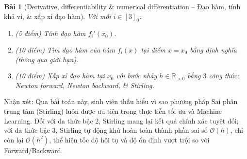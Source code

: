 \documentclass{article}
\newtheorem{baitoan}{Bài}
\begin{document}
\begin{baitoan}[Derivative, differentiability \& numerical differentiation -- Đạo hàm, tính khả vi, \& xấp xỉ đạo hàm]
	Với mỗi $i\in[3]_0$:
	\begin{enumerate}[label=(\alph*)]
		\item {\rm(5 điểm)} Tính đạo hàm $f_i'(x_0)$.
		\item {\rm(10 điểm)} Tìm đạo hàm của hàm $f_i(x)$ tại điểm $x = x_0$ bằng định nghĩa (thông qua giới hạn).
		\item {\rm(10 điểm)} Xấp xỉ đạo hàm tại $x_0$ với bước nhảy $h \in \mathbb{R}_{>0}$ bằng $3$ công thức: Newton forward, Newton backward, \& Stirling.
	\end{enumerate}
\end{baitoan}

\textsf{Nhận xét}: Qua bài toán này, sinh viên thấu hiểu vì sao phương pháp Sai phân trung tâm (Stirling) luôn được ưu tiên trong thực tiễn tối ưu và Machine Learning. Đối với đa thức bậc 2, Stirling mang lại kết quả chính xác tuyệt đối; với đa thức bậc 3, Stirling tự động khử hoàn toàn thành phần sai số $\mathcal{O}(h)$, chỉ còn lại $\mathcal{O}(h^2)$, thể hiện tốc độ hội tụ và độ ổn định vượt trội so với Forward/Backward.
\end{document}

